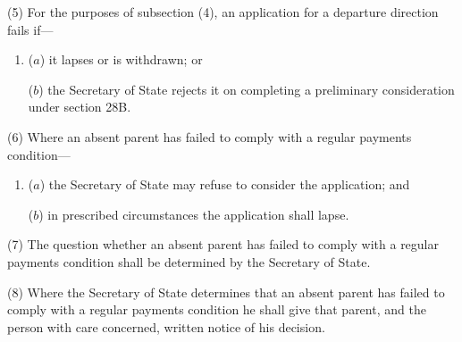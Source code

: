 \documentclass[a4paper]{article}
\begin{document}
{(5)
For the purposes of subsection (4), an application for a departure direction fails if---
\begin{enumerate}\item[]
($a$) it lapses or is withdrawn; or

($b$) the Secretary of State rejects it on completing a preliminary consideration under section 28B.
\end{enumerate}

(6) Where an absent parent has failed to comply with a regular payments condition---
\begin{enumerate}\item[]
($a$) the Secretary of State may refuse to consider the application; and

($b$) in prescribed circumstances the application shall lapse.
\end{enumerate}

(7)
The question whether an absent parent has failed to comply with a regular payments condition shall be determined by the Secretary of State.

(8)
Where the Secretary of State determines that an absent parent has failed to comply with a regular payments condition he shall give that parent, and the person with care concerned, written notice of his decision.


}
\end{document}
